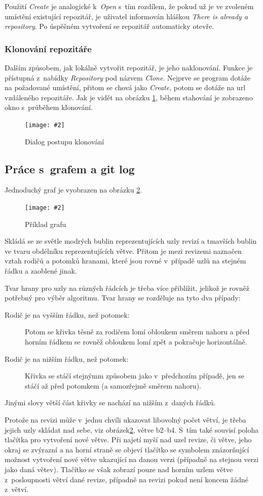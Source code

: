 \documentclass[
  biblatex,
  glossaries,
  index
]{kidiplom}
\newcommand{\pic}[4]{
\begin{figure}[h]
\centering
\texttt{[image: \#2]}
\caption{#3}
\label{fig:#4}
\end{figure}}
\begin{document}
Použití {\it Create} je analogické k~{\it Open} s~tím rozdílem, že pokud už je ve zvoleném umístění existující repozitář, je uživatel informován hláškou {\it There is already a repository}. Po úspěšném vytvoření se repozitář automaticky otevře.

\subsubsection{Klonování repozitáře}
Dalším způsobem, jak lokálně vytvořit repozitář, je jeho naklonování. Funkce je přístupná z~nabídky {\it Repository} pod názvem {\it Clone}. Nejprve se program dotáže na požadované umístění, přitom se chová jako {\it Create}, potom se dotáže na url vzdáleného repozitáře. Jak je vidět na obrázku \ref{fig:clone}, během stahování je zobrazeno okno s~průběhem klonování.


\pic{10cm}{clonning.png}{Dialog postupu klonování}{clone}


\subsection{Práce s~grafem a git log}
Jednoduchý graf je vyobrazen na obrázku \ref{fig:graph}.

\pic{10cm}{graph.png}{Příklad grafu}{graph}

Skládá se ze světle modrých bublin reprezentujících uzly revizí a tmavších bublin ve tvaru obdélníku reprezentujících větve. Přitom je mezi revizemi naznačen vztah rodičů a potomků hranami, které jsou rovné v~případě uzlů na stejném řádku a zaoblené jinak.

Tvar hrany pro uzly na různých řádcích je třeba více přiblížit, jelikož je rovněž potřebný pro výběr algoritmu. Tvar hrany se rozděluje na tyto dva případy:
\begin{description}
\item[Rodič je na vyšším řádku, než potomek:]
Potom se křivka těsně za rodičem lomí obloukem směrem nahoru a před horním řádkem se rovněž obloukem lomí zpět a pokračuje horizontálně.
\item[Rodič je na nižším řádku, než potomek:]
Křivka se stáčí stejnýmm způsobem jako v~předchozím případě, jen se stáčí až před potomkem (a samozřejmě směrem nahoru).
\end{description}
Jinými slovy větší část křivky se nachází na nižším z~daných řádků.

Protože na revizi může v~jednu chvíli ukazovat libovolný počet větví, je třeba jejich uzly skládat nad sebe, viz obrázek\ref{fig:graph}, větve b2--b4. S~tím také souvisí poloha tlačítka pro vytvoření nové větve. Při najetí myší nad uzel revize, či větve, jeho okraj se zvýrazní a na horní straně se objeví tlačítko se symbolem \uv{+} znázorňující možnost vytvoření nové větve ukazující na danou verzi (případně na stejnou verzi jako daná větev). Tlačítko se však zobrazí pouze nad horním uzlem větve z~posloupnosti větví dané revize, případně na revizi pokud není koncem žádné z~větví.
\end{document}
